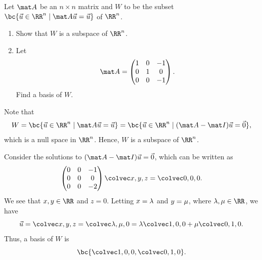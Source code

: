 \begin{problem}
    Let $\mat A$ be an $n \times n$ matrix and $W$ to be the subset $\bc{\vec u \in \RR^n \mid \mat A \vec u = \vec u}$ of $\RR^n$.

    \begin{enumerate}
        \item Show that $W$ is a subspace of $\RR^n$.
        \item Let \[\mat A = \begin{pmatrix}1 & 0 & -1 \\ 0 & 1 & 0 \\ 0 & 0 & -1\end{pmatrix}.\] Find a basis of $W$.
    \end{enumerate}
\end{problem}
\begin{solution}
    \begin{ppart}
        Note that \[W = \bc{\vec u \in \RR^n \mid \mat A \vec u = \vec u} = \bc{\vec u \in \RR^n \mid (\mat A - \mat I) \vec u = \vec 0},\] which is a null space in $\RR^n$. Hence, $W$ is a subspace of $\RR^n$.
    \end{ppart}
    \begin{ppart}
        Consider the solutions to $(\mat A - \mat I) \vec u = \vec 0$, which can be written as \[\begin{pmatrix}0 & 0 & -1 \\ 0 & 0 & 0 \\ 0 & 0 & -2 \end{pmatrix} \cveciii{x}{y}{z} = \cveciii{0}{0}{0}.\] We see that $x, y \in \RR$ and $z = 0$. Letting $x = \lambda$ and $y = \mu$, where $\l, \m \in \RR$, we have \[\vec u = \cveciii{x}{y}{z} = \cveciii{\l}{\m}{0} = \l \cveciii100 + \m \cveciii010.\] Thus, a basis of $W$ is \[\bc{\cveciii100, \cveciii010}.\]
    \end{ppart}
\end{solution}

